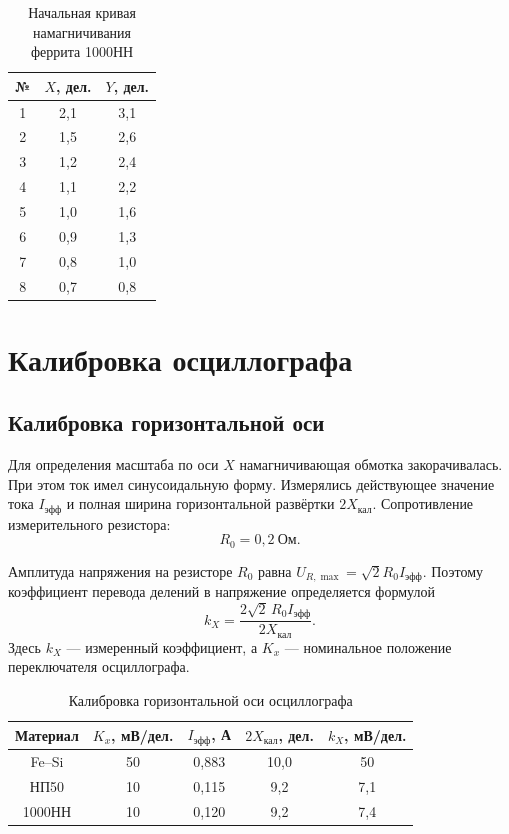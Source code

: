 \documentclass[12pt,a4paper]{article}
\begin{document}
\begin{table}[H]
    \centering
    \caption{Начальная кривая намагничивания
    феррита 1000НН}
    \label{tab:initial_3}
    \begin{tabular}{|c|c|c|}
        \hline
        № & $X$, дел. & $Y$, дел. \\
        \hline
        1 & 2,1 & 3,1 \\
        2 & 1,5 & 2,6 \\
        3 & 1,2 & 2,4 \\
        4 & 1,1 & 2,2 \\
        5 & 1,0 & 1,6 \\
        6 & 0,9 & 1,3 \\
        7 & 0,8 & 1,0 \\
        8 & 0,7 & 0,8 \\
        \hline
    \end{tabular}
\end{table}




\section{Калибровка осциллографа}

\subsection{Калибровка горизонтальной оси}

Для определения масштаба по оси $X$ намагничивающая обмотка
закорачивалась. При этом ток имел синусоидальную форму.
Измерялись действующее значение тока $I_{\text{эфф}}$ и полная
ширина горизонтальной развёртки $2X_{\text{кал}}$.
Сопротивление измерительного резистора:
\[
R_0=0{,}2\ \text{Ом}.
\]

Амплитуда напряжения на резисторе $R_0$ равна
$U_{R,\max}=\sqrt{2}R_0 I_{\text{эфф}}$. Поэтому
коэффициент перевода делений в напряжение определяется формулой
\begin{equation}
 k_X=\frac{2\sqrt{2}\,R_0I_{\text{эфф}}}{2X_{\text{кал}}}.
 \label{eq:kx_cal}
\end{equation}
Здесь $k_X$ --- измеренный коэффициент, а $K_x$ ---
номинальное положение переключателя осциллографа.

\begin{table}[H]
 \centering
 \caption{Калибровка горизонтальной оси осциллографа}
 \label{tab:cal_x}
 \small
 \setlength{\tabcolsep}{5pt}
 \begin{tabular}{|c|c|c|c|c|}
 \hline
 Материал & $K_x$, мВ/дел. & $I_{\text{эфф}}$, А &
 $2X_{\text{кал}}$, дел. & $k_X$, мВ/дел. \\
 \hline
 Fe--Si & 50 & 0,883 & 10,0 & 50 \\
 \hline
 НП50 & 10 & 0,115 & 9,2 & 7,1 \\
 \hline
 1000НН & 10 & 0,120 & 9,2 & 7,4 \\
 \hline
 \end{tabular}
\end{table}
\end{document}
